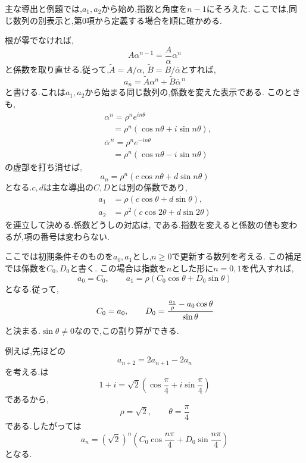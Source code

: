  主な導出と例題では,$a_1,a_2$から始め,指数と角度を$n-1$にそろえた.
  ここでは,同じ数列の別表示と,第0項から定義する場合を順に確かめる.

  根が零でなければ,
  \[
    A\alpha^{n-1}=\frac{A}{\alpha}\alpha^n
  \]
  と係数を取り直せる.従って,$\widetilde A=A/\alpha$,
  $\widetilde B=B/\overline\alpha$とすれば,
  \[
    a_n=\widetilde A\alpha^n+\widetilde B\overline\alpha^{\,n}
  \]
  と書ける.これは$a_1,a_2$から始まる同じ数列の,係数を変えた表示である.
  このときも,
  \[
    \begin{aligned}
      &\alpha^n=\rho^n e^{in\theta}\\
      &\quad=\rho^n(\cos n\theta+i\sin n\theta),\\
      &\overline\alpha^{\,n}=\rho^n e^{-in\theta}\\
      &\quad=\rho^n(\cos n\theta-i\sin n\theta)
    \end{aligned}
  \]
  の虚部を打ち消せば,
  \[
    a_n=\rho^n(c\cos n\theta+d\sin n\theta)
  \]
  となる.$c,d$は主な導出の$C,D$とは別の係数であり,
  \[
    \begin{aligned}
      a_1&=\rho(c\cos\theta+d\sin\theta),\\
      a_2&=\rho^2(c\cos2\theta+d\sin2\theta)
    \end{aligned}
  \]
  を連立して決める.係数どうしの対応は,
  \BookMathLayout{\[
    c=\frac{C\cos\theta-D\sin\theta}{\rho},\qquad
    d=\frac{C\sin\theta+D\cos\theta}{\rho}
  \]}{\[
    \begin{aligned}
      c&=\frac{C\cos\theta-D\sin\theta}{\rho},\\
      d&=\frac{C\sin\theta+D\cos\theta}{\rho}
    \end{aligned}
  \]}
  である.指数を変えると係数の値も変わるが,項の番号は変わらない.

  ここでは初期条件そのものを$a_0,a_1$とし,$n\ge0$で更新する数列を考える.
  この補足では係数を$C_0,D_0$と書く.
  この場合は指数を$n$とした形に$n=0,1$を代入すれば,
  \[
    a_0=C_0,\qquad a_1=\rho(C_0\cos\theta+D_0\sin\theta)
  \]
  となる.従って,
  \[
    C_0=a_0,\qquad
    D_0=\cfrac{\frac{a_1}{\rho}-a_0\cos\theta}{\sin\theta}
  \]
  と決まる.$\sin\theta\ne0$なので,この割り算ができる.

  例えば,先ほどの
  \[
    a_{n+2}=2a_{n+1}-2a_n
  \]
  を考える.は
  \[
    1+i
    =\sqrt{2}
    \left(
      \cos\frac{\pi}{4}
      +i\sin\frac{\pi}{4}
    \right)
  \]
  であるから,
  \[
    \rho=\sqrt{2},\qquad
    \theta=\frac{\pi}{4}
  \]
  である.したがっては
  \[
    a_n=(\sqrt{2})^n
    \left(
      C_0\cos\frac{n\pi}{4}
      +D_0\sin\frac{n\pi}{4}
    \right)
  \]
  となる.

